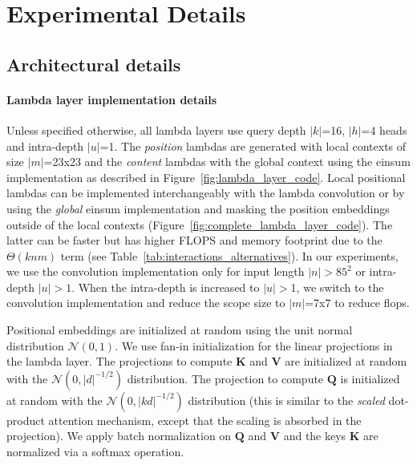 \documentclass{article} \usepackage{iclr2021_conference,times}
\begin{document}
\section{Experimental Details\label{sec:experimental_details}}

\subsection{Architectural details\label{sec:architecture_details}}

\vspace{-0.1cm}
\paragraph{Lambda layer implementation details\label{sec:implementation_details}}
Unless specified otherwise, all lambda layers use query depth $|k|$=16, $|h|$=4 heads and intra-depth $|u|$=1.
The \emph{position} lambdas are generated with local contexts of size $|m|$=23x23 and the \emph{content} lambdas with the global context using the einsum implementation as described in Figure~\ref{fig:lambda_layer_code}.
Local positional lambdas can be implemented interchangeably with the lambda convolution or by using the \emph{global} einsum implementation and masking the position embeddings outside of the local contexts (Figure~\ref{fig:complete_lambda_layer_code}).
The latter can be faster but has higher FLOPS and memory footprint due to the $\Theta(knm)$ term (see Table~\ref{tab:interactions_alternatives}).
In our experiments, we use the convolution implementation only for input length $|n|>85^2$ or intra-depth $|u|>1$.
When the intra-depth is increased to $|u|>$1, we switch to the convolution implementation and reduce the scope size to $|m|$=7x7 to reduce flops.

Positional embeddings are initialized at random using the unit normal distribution $\mathcal{N}(0, 1)$.
We use fan-in initialization for the linear projections in the lambda layer.
The projections to compute $\boldsymbol{K}$ and $\boldsymbol{V}$ are initialized at random with the $\mathcal{N}(0,|d|^{-1/2})$ distribution.
The projection to compute $\boldsymbol{Q}$ is initialized at random with the $\mathcal{N}(0, |kd|^{-1/2})$ distribution (this is similar to the \emph{scaled} dot-product attention mechanism, except that the scaling is absorbed in the projection).
We apply batch normalization on $\boldsymbol{Q}$ and $\boldsymbol{V}$ and the keys $\boldsymbol{K}$ are normalized via a softmax operation.
\end{document}
